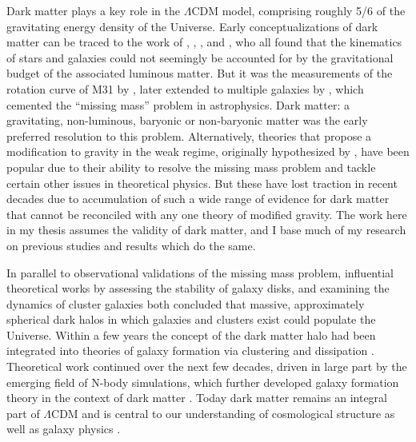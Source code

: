 Dark matter plays a key role in the $\Lambda$CDM model, comprising roughly 5/6 of the gravitating energy density of the Universe. Early conceptualizations of dark matter can be traced to the work of \textcite{kapteyn1922}, \textcite{oort32}, \textcite{zwicky33}, and \textcite{babcock39}, who all found that the kinematics of stars and galaxies could not seemingly be accounted for by the gravitational budget of the associated luminous matter. But it was the measurements of the rotation curve of M31 by \textcite{rubin70}, later extended to multiple galaxies by \textcite{rubin80}, which cemented the ``missing mass'' problem in astrophysics. Dark matter: a gravitating, non-luminous, baryonic or non-baryonic matter was the early preferred resolution to this problem. Alternatively, theories that propose a modification to gravity in the weak regime, originally hypothesized by \textcite{milgrom83}, have been popular due to their ability to resolve the missing mass problem and tackle certain other issues in theoretical physics. But these have lost traction in recent decades due to accumulation of such a wide range of evidence for dark matter that cannot be reconciled with any one theory of modified gravity. The work here in my thesis assumes the validity of dark matter, and I base much of my research on previous studies and results which do the same.

In parallel to observational validations of the missing mass problem, influential theoretical works by \textcite{ostriker73} assessing the stability of galaxy disks, and \textcite{einasto74} examining the dynamics of cluster galaxies both concluded that massive, approximately spherical dark halos in which galaxies and clusters exist could populate the Universe. Within a few years the concept of the dark matter halo had been integrated into theories of galaxy formation via clustering and dissipation \parencite{white78}. Theoretical work continued over the next few decades, driven in large part by the emerging field of N-body simulations, which further developed galaxy formation theory in the context of dark matter \parencite{white91}. Today dark matter remains an integral part of $\Lambda$CDM and is central to our understanding of cosmological structure as well as galaxy physics \parencite[e.g.][]{frenk12}.

